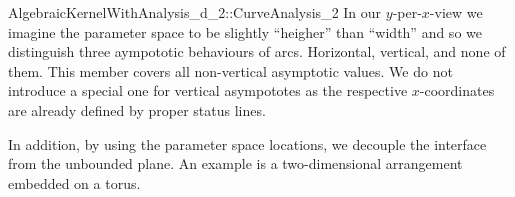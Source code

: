 \begin{ccRefConcept}{AlgebraicKernelWithAnalysis_d_2::CurveAnalysis_2}
In our $y$-per-$x$-view we imagine the parameter space to be slightly 
``heigher'' than ``width'' and so we distinguish three aympototic behaviours
of arcs. Horizontal, vertical, and none of them. This member covers 
all non-vertical asymptotic values. We do not introduce a special one
for vertical asympototes as the respective $x$-coordinates are already defined
by proper status lines.

In addition, by using the parameter space locations, 
we decouple the interface from the unbounded plane. An example is a 
two-dimensional arrangement embedded on a torus.

\end{ccRefConcept}
